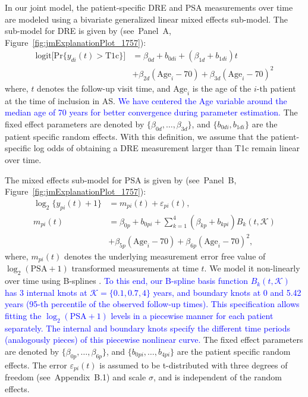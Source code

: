 In our joint model, the patient-specific DRE and PSA measurements over time are modeled using a bivariate generalized linear mixed effects sub-model. The sub-model for DRE is given by (see~Panel~A, Figure~\ref{fig:jmExplanationPlot_1757}):
\begin{equation}
\label{eq:long_model_dre}
\begin{split}
    \mbox{logit} \big[\mbox{Pr}\{y_{di}(t) > \mbox{T1c}\}\big] &= \beta_{0d} + b_{0di} + (\beta_{1d} + b_{1di}) t\\
    &+ \beta_{2d} (\mbox{Age}_i-70) + \beta_{3d} (\mbox{Age}_i-70)^2
    \end{split}
\end{equation}
where, $t$ denotes the follow-up visit time, and $\mbox{Age}_i$ is the age of the ${i\mbox{-th}}$ patient at the time of inclusion in AS. \textcolor{blue}{We have centered the Age variable around the median age of 70 years for better convergence during parameter estimation.} The fixed effect parameters are denoted by ${\{\beta_{0d}, \ldots, \beta_{3d}\}}$, and ${\{b_{0di}, b_{1di}\}}$ are the patient specific random effects. With this definition, we assume that the patient-specific log odds of obtaining a DRE measurement larger than T1c remain linear over time. 

The mixed effects sub-model for PSA is given by (see~Panel~B, Figure~\ref{fig:jmExplanationPlot_1757}):
\begin{equation}
\label{eq:long_model_psa}
\begin{split}
    \log_2 \big\{y_{pi}(t) + 1\big\} &= m_{pi}(t) + \varepsilon_{pi}(t),\\
    m_{pi}(t) &= \beta_{0p} + b_{0pi} + \sum_{k=1}^4 (\beta_{kp} + b_{kpi})  B_k(t,\mathcal{K})\\ 
    &+ \beta_{5p} (\mbox{Age}_i-70) + \beta_{6p} (\mbox{Age}_i-70)^2,
    \end{split}
\end{equation}
where, $m_{pi}(t)$ denotes the underlying measurement error free value of $\log_2 (\mbox{PSA} + 1)$ transformed \citep{pearson1994mixed,lin2000latent} measurements at time $t$. We model it non-linearly over time using B-splines \citep{de1978practical}. \textcolor{blue}{To this end, our B-spline basis function $B_k(t, \mathcal{K})$ has 3 internal knots at $\mathcal{K} = \{0.1, 0.7, 4\}$ years, and boundary knots at 0 and 5.42 years (95-th percentile of the observed follow-up times). This specification allows fitting the $\log_2 (\mbox{PSA} + 1)$ levels in a piecewise manner for each patient separately. The internal and boundary knots specify the different time periods (analogously pieces) of this piecewise nonlinear curve.} The fixed effect parameters are denoted by ${\{\beta_{0p},\ldots,\beta_{6p}\}}$, and ${\{b_{0pi}, \ldots, b_{4pi}\}}$ are the patient specific random effects. The error $\varepsilon_{pi}(t)$ is assumed to be t-distributed with three degrees of freedom (see~Appendix~B.1) and scale $\sigma$, and is independent of the random effects. 

